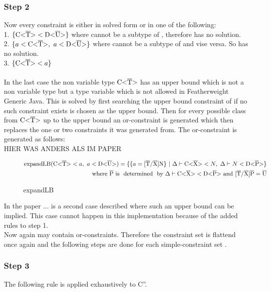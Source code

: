 \subsubsection{Step 2}
Now every constraint is either in solved form or in one of the following: \\
1. $\{ \text{C<}\overline{\text{T}}\text{>} < \text{D<}\overline{\text{U}}\text{>} \}$ where  cannot be a subtype of , therefore  has no solution.\\
2. $\{ a < \text{C<}\overline{\text{T}}\text{>}, \ a < \text{D<}\overline{\text{U}}\text{>} \}$ where  cannot be a subtype of  and vise versa. So  has no solution.\\
3. $\{ \text{C<}\overline{\text{T}}\text{>} < a \}$\\
\\
In the last case the non variable type $\text{C<}\overline{\text{T}}\text{>}$ has an upper bound which is not a non variable type but a type variable which is not allowed in Featherweight Generic Java.
This is solved by first searching the upper bound constraint of  if no such constraint exists  is chosen as the upper bound. Then for every possible class
from $\text{C<}\overline{\text{T}}\text{>}$ up to the upper bound an or-constraint is generated which then replaces the one or two constraints it was generated from.
The or-constraint is generated as follows:
\\
HIER WAS ANDERS ALS IM PAPER

\begin{figure}[H]
    \begin{align*}
        \text{expandLB} ( \nvt{C}{T} < a, \ a < \nvt{D}{U} ) = \{ \{ a = \tsxsn{T}{X}{N} \} \ | \ \Delta \vdash \nvt{C}{X} < N, \ \Delta \vdash N < \nvt{D}{P} \}\\
        \text{where} \ \ot{P} \ \text{is \ determined \ by } \Delta \vdash \nvt{C}{X} < \nvt{D}{P} \ \text{and} \ \tsxsns{T}{X}{P} = \ot{U}
    \end{align*}
    \caption{expandLB}
    \label{expandlb}
\end{figure}

In the paper ...  is a second case described where such an upper bound can be implied. This case cannot happen in this implementation because of the added rules to step 1.\\
Now  again may contain or-constraints. Therefore the constraint set  is flattend once again and the following steps are done for each simple-constraint set .

\subsubsection{Step 3}
The following rule is applied exhaustively to C''.

